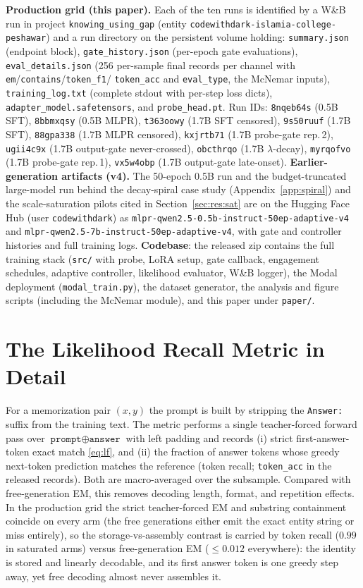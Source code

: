 \textbf{Production grid (this paper).} Each of the ten runs is
identified by a W\&B run in project \texttt{knowing\_using\_gap}
(entity \texttt{codewithdark-islamia-college-peshawar}) and a run
directory on the persistent volume holding:
\texttt{summary.json} (endpoint block),
\texttt{gate\_history.json} (per-epoch gate evaluations),
\texttt{eval\_details.json} (256 per-sample final records per channel
with \texttt{em}/\texttt{contains}/\texttt{token\_f1}/
\texttt{token\_acc} and \texttt{eval\_type}, the McNemar inputs),
\texttt{training\_log.txt} (complete stdout with per-step loss
dicts), \texttt{adapter\_model.safetensors}, and
\texttt{probe\_head.pt}. Run IDs: \texttt{8nqeb64s} (0.5B SFT),
\texttt{8bbmxqsy} (0.5B MLPR), \texttt{t363oowy} (1.7B SFT censored),
\texttt{9s50ruuf} (1.7B SFT), \texttt{88gpa338} (1.7B MLPR censored),
\texttt{kxjrtb71} (1.7B probe-gate rep.\,2), \texttt{ugii4c9x}
(1.7B output-gate never-crossed), \texttt{obcthrqo} (1.7B
$\lambda$-decay), \texttt{myrqofvo} (1.7B probe-gate rep.\,1),
\texttt{vx5w4obp} (1.7B output-gate late-onset).
\textbf{Earlier-generation artifacts (v4).} The 50-epoch 0.5B run and
the budget-truncated large-model run behind the decay-spiral case
study (Appendix~\ref{app:spiral}) and the scale-saturation pilots
cited in Section~\ref{sec:res:sat} are on the Hugging Face Hub (user
\texttt{codewithdark}) as
\texttt{mlpr-qwen2.5-0.5b-instruct-50ep-adaptive-v4} and
\texttt{mlpr-qwen2.5-7b-instruct-50ep-adaptive-v4}, with gate and
controller histories and full training logs.
\textbf{Codebase}: the released zip contains the full training stack
(\texttt{src/} with probe, LoRA setup, gate callback, engagement
schedules, adaptive controller, likelihood evaluator, W\&B logger),
the Modal deployment (\texttt{modal\_train.py}), the dataset
generator, the analysis and figure scripts (including the McNemar
module), and this paper under \texttt{paper/}.

\section{The Likelihood Recall Metric in Detail}
\label{app:lfmetric}

For a memorization pair $(x, y)$ the prompt is built by stripping the
\texttt{Answer:} suffix from the training text. The metric performs a
single teacher-forced forward pass over
$\texttt{prompt} \oplus \texttt{answer}$ with left padding and records
(i) strict first-answer-token exact match \eqref{eq:lf}, and (ii) the
fraction of answer tokens whose greedy next-token prediction matches
the reference (token recall; \texttt{token\_acc} in the released
records). Both are macro-averaged over the subsample. Compared with
free-generation EM, this removes decoding length, format, and
repetition effects. In the production grid the strict teacher-forced
EM and substring containment coincide on every arm (the free
generations either emit the exact entity string or miss entirely), so
the storage-vs-assembly contrast is carried by token recall
($0.99$ in saturated arms) versus free-generation EM
($\le 0.012$ everywhere): the identity is stored and linearly
decodable, and its first answer token is one greedy step away, yet
free decoding almost never assembles it.
